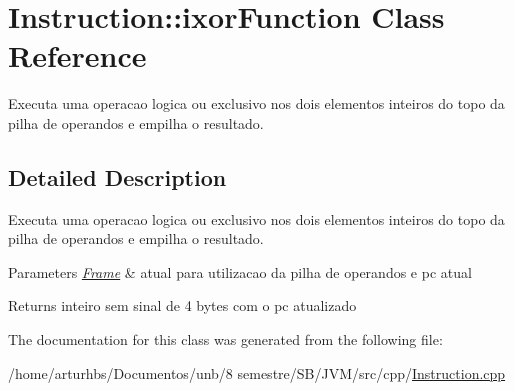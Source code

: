\hypertarget{classInstruction_1_1ixorFunction}{}\section{Instruction\+:\+:ixor\+Function Class Reference}
\label{classInstruction_1_1ixorFunction}


Executa uma operacao logica \textquotesingle{}ou exclusivo\textquotesingle{} nos dois elementos inteiros do topo da pilha de operandos e empilha o resultado.  




\subsection{Detailed Description}
Executa uma operacao logica \textquotesingle{}ou exclusivo\textquotesingle{} nos dois elementos inteiros do topo da pilha de operandos e empilha o resultado. 


\begin{DoxyParams}{Parameters}
{\em \hyperlink{classFrame}{Frame}} & atual para utilizacao da pilha de operandos e pc atual \\
\hline
\end{DoxyParams}
\begin{DoxyReturn}{Returns}
inteiro sem sinal de 4 bytes com o pc atualizado 
\end{DoxyReturn}


The documentation for this class was generated from the following file\+:\begin{DoxyCompactItemize}
\item 
/home/arturhbs/\+Documentos/unb/8 semestre/\+S\+B/\+J\+V\+M/src/cpp/\hyperlink{Instruction_8cpp}{Instruction.\+cpp}\end{DoxyCompactItemize}
